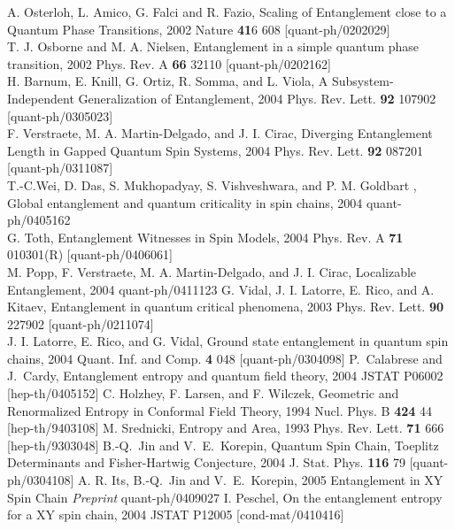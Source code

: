 {\begin{thebibliography}{99}

A. Osterloh, L. Amico, G. Falci and R. Fazio,
Scaling of Entanglement close to a Quantum Phase Transitions,
2002 Nature {\bf 41}6 608 [quant-ph/0202029]\\
T. J. Osborne and M. A. Nielsen,
Entanglement in a simple quantum phase transition,
2002 Phys. Rev. A {\bf 66} 32110 [quant-ph/0202162]\\
H. Barnum, E. Knill, G. Ortiz, R. Somma, and L. Viola, 
A Subsystem-Independent Generalization of Entanglement,
2004 Phys. Rev. Lett. {\bf 92} 107902 [quant-ph/0305023]\\
F. Verstraete, M. A. Martin-Delgado, and J. I. Cirac,
Diverging Entanglement Length in Gapped Quantum Spin Systems,
2004 Phys. Rev. Lett. {\bf 92} 087201 [quant-ph/0311087]\\
T.-C.Wei, D. Das, S. Mukhopadyay, S. Vishveshwara, and P. M. Goldbart ,
Global entanglement and quantum criticality in spin chains,
2004 quant-ph/0405162\\
G. Toth, Entanglement Witnesses in Spin Models, 
2004 Phys. Rev. A {\bf 71} 010301(R) [quant-ph/0406061]\\
M. Popp, F. Verstraete, M. A. Martin-Delgado, and J. I. Cirac,
Localizable Entanglement, 2004 quant-ph/0411123
%
G. Vidal, J. I. Latorre, E. Rico, and A. Kitaev,
Entanglement in quantum critical phenomena,
2003 Phys. Rev. Lett. {\bf 90} 227902 [quant-ph/0211074]\\
J. I. Latorre, E. Rico, and G. Vidal,
Ground state entanglement in quantum spin chains,
2004 Quant. Inf. and Comp. {\bf 4} 048 [quant-ph/0304098]
%
P.~Calabrese and J.~Cardy,
Entanglement entropy and quantum field theory, 2004 
JSTAT P06002 [hep-th/0405152]
%
 C. Holzhey, F. Larsen, and F. Wilczek,
Geometric and Renormalized Entropy in Conformal Field Theory,
1994 Nucl. Phys. B {\bf 424} 44 [hep-th/9403108]
%
 M. Srednicki, Entropy and Area, 
1993 Phys. Rev. Lett. {\bf 71} 666 [hep-th/9303048]
%
B.-Q.~Jin and V.~E.~Korepin,
Quantum Spin Chain, Toeplitz Determinants and Fisher-Hartwig Conjecture,
2004 J. Stat. Phys. {\bf 116} 79 [quant-ph/0304108]
%
A. R. Its, B.-Q.~Jin and V.~E.~Korepin, 
2005 Entanglement in XY Spin Chain {\it Preprint} quant-ph/0409027
%
I. Peschel, On the entanglement entropy for a XY spin chain, 
2004 JSTAT P12005 [cond-mat/0410416]




\end{thebibliography}}
